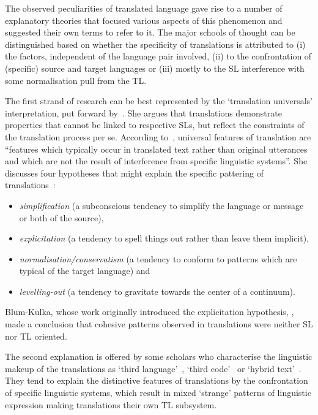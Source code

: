 \label{pg:three_strands_in_translationese_studies}
The observed peculiarities of translated language gave rise to a number of explanatory theories that focused various aspects of this phenomenon and suggested their own terms to refer to it. The major schools of thought can be distinguished based on whether the specificity of translations is attributed to (i) the factors, independent of the language pair involved, (ii) to the confrontation of (specific) source and target languages or (iii) mostly to the SL interference with some normalisation pull from the TL. 

The first strand of research can be best represented by the `translation universals' interpretation, put forward by~\citet{Baker1993}. She argues that translations demonstrate properties that cannot be linked to respective SLs, but reflect the constraints of the translation process per se. According to~\citet[p.243]{Baker1993}, universal features of translation are ``features which typically occur in translated text rather than original utterances and which are not the result of interference from specific linguistic systems''. She discusses four hypotheses that might explain the specific pattering of translations~\cite[pp.176--177, 183--184]{Baker1996}: 
\label{pg:major_trends}
\begin{itemize}\compresslist{}
	\item \textit{simplification} (a subconscious tendency to simplify the language or message or both of the source),
	\item \textit{explicitation} (a tendency to spell things out rather than leave them implicit), 
	\item \textit{normalisation/conservatism} (a tendency to conform to patterns which are typical of the target language) and
	\item \textit{levelling-out} (a tendency to gravitate towards the center of a continuum). 
\end{itemize}
Blum-Kulka, whose work originally introduced the explicitation hypothesis, \citet{BlumKulka1986}, made a conclusion that cohesive patterns observed in translations were neither SL nor TL oriented. 

The second explanation is offered by some scholars who characterise the linguistic makeup of the translations as `third language'~\cite{Duff1981}, `third code'~\cite{Frawley1984} or `hybrid text'~\cite{Schaffner2001a,Schaffner2001b}. They tend to explain the distinctive features of translations by the confrontation of specific linguistic systems, which result in mixed `strange' patterns of linguistic expression making translations their own TL subsystem. 

